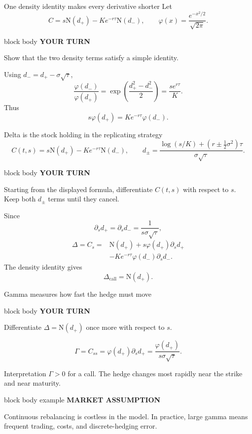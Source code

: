 \documentclass[handout,10pt,aspectratio=169]{beamer}
\newenvironment{marketbox}{%
  \begin{beamercolorbox}[rounded=true,sep=0.7em,wd=\textwidth]{block body example}
  \textbf{\color{CourseGreen}MARKET ASSUMPTION}\quad
}{\end{beamercolorbox}}
\newenvironment{pausebox}{%
  \begin{beamercolorbox}[rounded=true,sep=0.8em,wd=\textwidth]{block body}
  \textbf{\color{CourseGold}YOUR TURN}\quad
}{\end{beamercolorbox}}
\newcommand{\Ncdf}{\mathrm N}
\newcommand{\phiN}{\varphi}
\newcommand{\1}{\mathbf 1}
\begin{document}
\begin{frame}{One density identity makes every derivative shorter}
Let
\[
C=s\Ncdf(d_+)-Ke^{-r\tau}\Ncdf(d_-),
\qquad
\phiN(x)=\frac{e^{-x^2/2}}{\sqrt{2\pi}}.
\]
\begin{pausebox}
Show that the two density terms satisfy a simple identity.
\end{pausebox}

Using \(d_-=d_+-\sigma\sqrt{\tau}\),
\[
\frac{\phiN(d_-)}{\phiN(d_+)}
=\exp\left(\frac{d_+^2-d_-^2}{2}\right)
=\frac{se^{r\tau}}{K}.
\]
Thus
\[
\boxed{s\phiN(d_+)=Ke^{-r\tau}\phiN(d_-).}
\]
\end{frame}

\begin{frame}[shrink=5]{Delta is the stock holding in the replicating strategy}
\[
C(t,s)=s\Ncdf(d_+)-Ke^{-r\tau}\Ncdf(d_-),
\qquad
d_\pm=\frac{\log(s/K)+(r\pm\frac12\sigma^2)\tau}
{\sigma\sqrt{\tau}}.
\]
\begin{pausebox}
Starting from the displayed formula, differentiate \(C(t,s)\) with respect
to \(s\). Keep both \(d_\pm\) terms until they cancel.
\end{pausebox}

Since
\[
\partial_s d_+=\partial_s d_-=\frac{1}{s\sigma\sqrt{\tau}},
\]
\[
\begin{aligned}
\Delta=C_s
={}&\Ncdf(d_+)+s\phiN(d_+)\partial_sd_+\\
&-Ke^{-r\tau}\phiN(d_-)\partial_sd_-.
\end{aligned}
\]
The density identity gives
\[
\boxed{\Delta_{\mathrm{call}}=\Ncdf(d_+).}
\]
\end{frame}

\begin{frame}{Gamma measures how fast the hedge must move}
\begin{pausebox}
Differentiate \(\Delta=\Ncdf(d_+)\) once more with respect to \(s\).
\end{pausebox}

\[
\Gamma=C_{ss}
=\phiN(d_+)\partial_sd_+
=\boxed{\frac{\phiN(d_+)}{s\sigma\sqrt{\tau}}.}
\]
\begin{exampleblock}{Interpretation}
\(\Gamma>0\) for a call. The hedge changes most rapidly near the strike and
near maturity.
\end{exampleblock}
\begin{marketbox}
Continuous rebalancing is costless in the model. In practice, large gamma
means frequent trading, costs, and discrete-hedging error.
\end{marketbox}
\end{frame}
\end{document}
